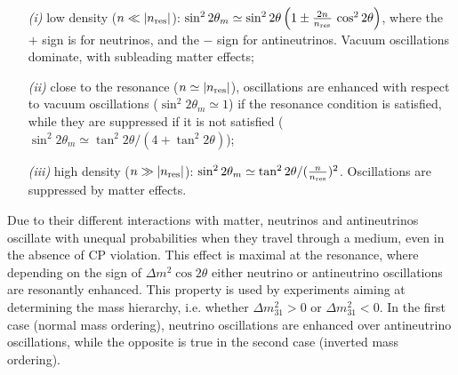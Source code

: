 \begin{itemize}
%
\item[{\it (i)}] low density ($n \ll |n_{\rm res}|$):
$\sin^2 2 \theta_m \simeq \sin^2 2 \theta \left( 1 \pm \frac{2 n}{n_{\rm res}}\, \cos^2 2 \theta \right)$,
where the $+$ sign is for neutrinos, and the $-$ sign for antineutrinos.
Vacuum oscillations dominate, with subleading matter effects;
%
\item[{\it (ii)}] close to the resonance ($n \simeq |n_{\rm res}|$), oscillations are enhanced
with respect to vacuum oscillations ($\sin^2 2 \theta_m \simeq 1$) if the resonance condition
is satisfied, while they are suppressed if it is not satisfied
($\sin^2 2 \theta_m \simeq \tan^2 2 \theta / (4 + \tan^2 2 \theta)$);
%
\item[{\it (iii)}] high density ($n \gg |n_{\rm res}|$):
$\sin^2 2 \theta_m \simeq \tan^2 2 \theta / (\frac{n}{n_{\rm res}})^2$.
Oscillations are suppressed by matter effects.
%
\end{itemize}



Due to their different interactions with matter, neutrinos and antineutrinos oscillate with unequal
probabilities when they travel through a medium, even in the absence of CP violation.
This effect %
is maximal at the resonance, where depending on the sign of $\Delta m^2 \cos 2 \theta$
either neutrino or antineutrino oscillations are resonantly enhanced.
This property is used by experiments aiming at determining the mass hierarchy, i.e. whether
$\Delta m^2_{31} > 0$ or $\Delta m^2_{31} < 0$. In the first case (normal mass ordering),
neutrino oscillations are enhanced over antineutrino oscillations,
while the opposite is true in the second case (inverted mass ordering).

